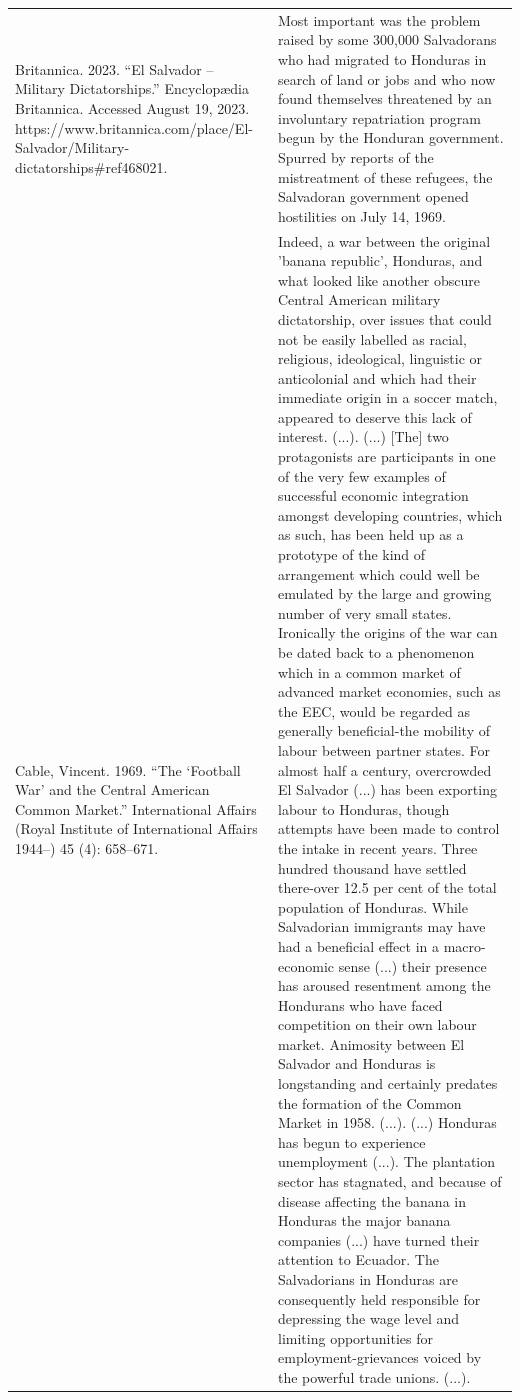 {\begin{longtable}{p{}p{}}
\\
Britannica. 2023. “El Salvador – Military Dictatorships.” Encyclopædia Britannica. Accessed August 19, 2023. https://www.britannica.com/place/El-Salvador/Military-dictatorships\#ref468021. & Most important was the problem raised by some 300,000 Salvadorans who had migrated to Honduras in search of land or jobs and who now found themselves threatened by an involuntary repatriation program begun by the Honduran government. Spurred by reports of the mistreatment of these refugees, the Salvadoran government opened hostilities on July 14, 1969.
\\
Cable, Vincent. 1969. “The ‘Football War’ and the Central American Common Market.” International Affairs (Royal Institute of International Affairs 1944–) 45 (4): 658–671. & Indeed, a war between the original 'banana republic', Honduras, and what looked like another obscure Central American military dictatorship, over issues that could not be easily labelled as racial, religious, ideological, linguistic or anticolonial and which had their immediate origin in a soccer match, appeared to deserve this lack of interest. (...). (...) [The] two protagonists are participants in one of the very few examples of successful economic integration amongst developing countries, which as such, has been held up as a prototype of the kind of arrangement which could well be emulated by the large and growing number of very small states. Ironically the origins of the war can be dated back to a phenomenon which in a common market of advanced market economies, such as the EEC, would be regarded as generally beneficial-the mobility of labour between partner states. For almost half a century, overcrowded El Salvador (...) has been exporting labour to Honduras, though attempts have been made to control the intake in recent years. Three hundred thousand have settled there-over 12.5 per cent of the total population of Honduras. While Salvadorian immigrants may have had a beneficial effect in a macro-economic sense (...) their presence has aroused resentment among the Hondurans who have faced competition on their own labour market. Animosity between El Salvador and Honduras is longstanding and certainly predates the formation of the Common Market in 1958. (...). (...) Honduras has begun to experience unemployment (...). The plantation sector has stagnated, and because of disease affecting the banana in Honduras the major banana companies (...) have turned their attention to Ecuador. The Salvadorians in Honduras are consequently held responsible for depressing the wage level and limiting opportunities for employment-grievances voiced by the powerful trade unions. (...). 

\end{longtable}}
